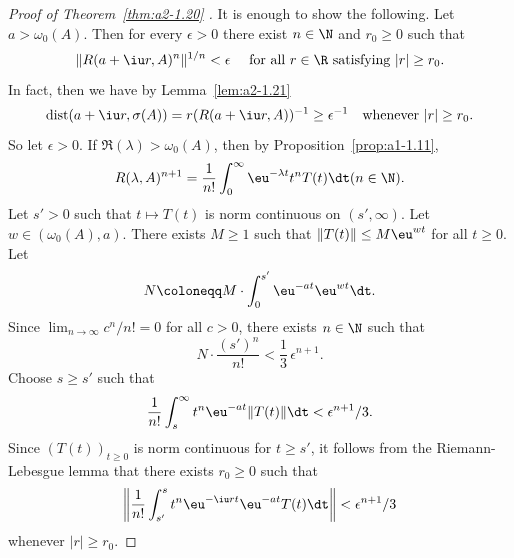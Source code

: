 \begin{proof}[Proof of Theorem~\ref{thm:a2-1.20}  ]
It is enough to show the following.
Let $a > \omega_{0}(A)$.
Then for every $\epsilon > 0$ there exist $n \in \N$ and $r_0 \geq 0$ such that
\[
\|R(a+ \iu r,A)^n\|^{1/n} < \epsilon \quad  \text{ for all } r \in \R \text{ satisfying $|r| \geq r_{0}$.}
\]
In fact, then we have by Lemma~\ref{lem:a2-1.21} 
\[
\text{dist}(a+\iu r,\sigma(A)) = r(R(a+ \iu r,A))^{-1} \geq \epsilon^{-1} \quad \text{whenever $|r| \geq r_{0}$.}
\]
So let $\epsilon > 0$.
If\/ $\Re(\lambda) > \omega_{0}(A)$, then by Proposition~\ref{prop:a1-1.11},
\[
R(\lambda,A)^{n+1} = \frac{1}{n!}\int_0^\infty \eu^{-\lambda t}t^nT(t) \dt (n \in \N).
\]
Let $s' > 0$ such that $t \mapsto T(t)$ is norm continuous on $(s',\infty)$.
Let $w \in (\omega_{0}(A),a)$.
There exists $M \geq 1$ such that $\|T(t)\| \leq M\eu^{wt}$ for all $t \geq 0$.
Let 
\[
N \coloneqq M\cdot\int_{0}^{s'} \eu^{-at}\eu^{wt} \dt.
\]
Since $\lim_{n\to\infty} c^n/n! = 0$ for all $c > 0$, there exists $n \in \N$ such that 
%
\[
	N\cdot \frac{(s')^n}{n!} < \frac{1}{3}\,\epsilon^{n+1}.
\]
%
Choose $s \geq s'$ such that 
%
\[
	\frac{1}{n!}\int_{s}^{\infty} t^n\eu^{-at}\|T(t)\| \dt < \epsilon^{n+1}/3 .
\]
%
Since $(T(t))_{t\geq 0}$ is norm continuous for $t \geq s'$, it follows from the Riemann-Lebesgue lemma that there exists $r_{0} \geq 0$ such that 
\[
\left\lVert \frac{1}{n!}\int_{s'}^s t^{n}\eu^{-\iu rt}\eu^{-at}T(t) \dt \right\lVert  < \epsilon^{n+1}/3
\]
 whenever $|r| \geq r_{0}$.


\end{proof}
